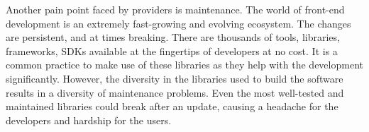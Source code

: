 Another pain point faced by providers is maintenance. The world of front-end development is an extremely fast-growing and evolving ecosystem. The changes are persistent, and at times breaking. There are thousands of tools, libraries, frameworks, SDKs available at the fingertips of developers at no cost. It is a common practice to make use of these libraries as they help with the development significantly. However, the diversity in the libraries used to build the software results in a diversity of maintenance problems. Even the most well-tested and maintained libraries could break after an update, causing a headache for the developers and hardship for the users.